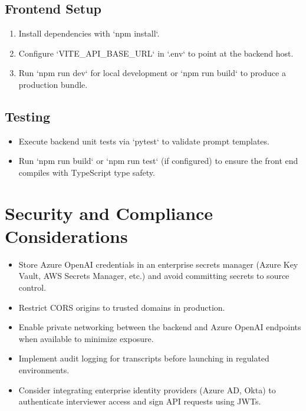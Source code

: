 \documentclass[11pt]{article}
\begin{document}
\subsection{Frontend Setup}
\begin{enumerate}[leftmargin=*]
  \item Install dependencies with `npm install`.
  \item Configure `VITE_API_BASE_URL` in `.env` to point at the backend host.
  \item Run `npm run dev` for local development or `npm run build` to produce a production bundle.
\end{enumerate}

\subsection{Testing}
\begin{itemize}[leftmargin=*]
  \item Execute backend unit tests via `pytest` to validate prompt templates.
  \item Run `npm run build` or `npm run test` (if configured) to ensure the front end compiles with TypeScript type safety.
\end{itemize}

\section{Security and Compliance Considerations}
\begin{itemize}[leftmargin=*]
  \item Store Azure OpenAI credentials in an enterprise secrets manager (Azure Key Vault, AWS Secrets Manager, etc.) and avoid committing secrets to source control.
  \item Restrict CORS origins to trusted domains in production.
  \item Enable private networking between the backend and Azure OpenAI endpoints when available to minimize exposure.
  \item Implement audit logging for transcripts before launching in regulated environments.
  \item Consider integrating enterprise identity providers (Azure AD, Okta) to authenticate interviewer access and sign API requests using JWTs.
\end{itemize}
\end{document}
